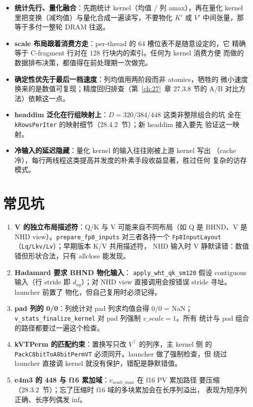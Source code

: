 \begin{itemize}[itemsep=1pt,topsep=2pt]
  \item \textbf{统计先行、量化融合}：先跑统计 kernel（均值 / 列 amax），再在量化
        kernel 里把变换（减均值）与量化合成一遍读写，不要物化
        $K'$ 或 $V'$ 中间张量，那等于多付一整轮 DRAM 往返。
  \item \textbf{scale 布局跟着消费方走}：per-thread 的 64 槽位表不是随意设定的，它
        精确等于 C-fragment 行对在 128 行块内的索引。任何为 kernel 消费方便
        而做的数据排布决策，都值得在前处理期一次做完。
  \item \textbf{确定性优先于最后一档速度}：列均值用两阶段而非 atomics，牺牲的
        微小速度换来的是数值可复现；精度回归排查（第~\ref{ch:27}~章 27.3.8
        节的 A/B 对比方法）依赖这一点。
  \item \textbf{headdim 泛化在行组映射上}：$D=320/384/448$ 这类非整除组合的坑
        全在 \texttt{kRowsPerIter} 的映射细节（28.4.2~节）；新 headdim 接入要先
        验证这一映射。
  \item \textbf{冷输入的延迟隐藏}：量化 kernel 的输入往往刚被上游 kernel 写出
        （cache 冷），每行两线程这类提高并发度的朴素手段收益显著，胜过任何
        复杂的访存模式。
\end{itemize}

\section{常见坑}

\begin{enumerate}[itemsep=1pt,topsep=2pt]
  \item \textbf{V 的独立布局描述符}：Q/K 与 V 可能来自不同布局（如 Q 是
        BHND、V 是 NHD view）。\texttt{prepare\_fp8\_inputs} 对三者各持一个
        \texttt{Fp8InputLayout}（\texttt{Lq/Lkv/Lv}）；早期版本 K/V 共用描述符，
        NHD 输入时 V 静默读错：数值错但形状合法，只有 allclose 能发现。
  \item \textbf{Hadamard 要求 BHND 物化输入}：
        \texttt{apply\_wht\_qk\_sm120} 假设 contiguous 输入（行 stride 即
        $d_{og}$）；对 NHD view 直接调用会按错误 stride 寻址。launcher 前置了
        物化，但自己复用时必须记得。
  \item \textbf{pad 列的 0/0}：列统计对 pad 列求均值会得 0/0 = NaN；
        \texttt{v\_stats\_finalize\_kernel} 对 pad 列强制 $v\_scale = 1$。所有
        统计与 pad 组合的路径都要过一遍这个检查。
  \item \textbf{kVTPerm 的匹配约束}：置换写只改 $V^{\top}$ 的列序，主 kernel 侧
        的 \texttt{PackC8bitToA8bitPermVT} 必须同开。launcher 做了强制检查，但
        绕过 launcher 直接调 kernel 就没有保护，错配是静默错值。
  \item \textbf{e4m3 的 448 与 f16 累加域}：$v_{scale\_max}$ 在 f16 PV 累加路径
        要压缩（28.3.2~节）；忘了压缩时 f16 域的多块累加会在长序列溢出，
        表现为短序列正确、长序列偶发 inf。
\end{enumerate}

